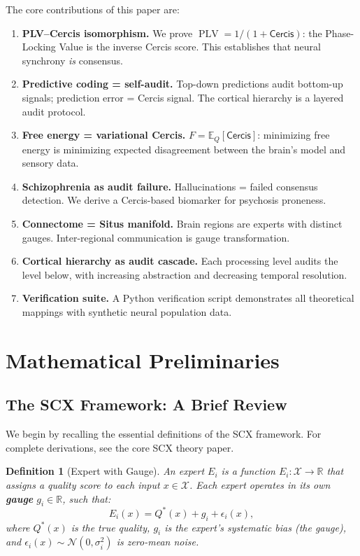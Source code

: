 \documentclass[12pt,a4paper]{article}
\newtheorem{definition}[theorem]{Definition}
\theoremstyle{remark}
\newcommand{\R}{\mathbb{R}}
\newcommand{\E}{\mathbb{E}}
\newcommand{\X}{\mathcal{X}}
\newcommand{\SCX}{\textsf{SCX}}
\newcommand{\Cercis}{\textsf{Cercis}}
\newcommand{\Situs}{\textsf{Situs}}
\newcommand{\FreeEnergy}{F}
\DeclareMathOperator{\PLV}{PLV}
\begin{document}
The core contributions of this paper are:

\begin{enumerate}[label=\textbf{C\arabic*}, leftmargin=*]
    \item \textbf{PLV--Cercis isomorphism.} We prove $\PLV = 1/(1 + \Cercis)$: the Phase-Locking Value is the inverse \Cercis{} score. This establishes that neural synchrony \emph{is} consensus.
    \item \textbf{Predictive coding = self-audit.} Top-down predictions audit bottom-up signals; prediction error = \Cercis{} signal. The cortical hierarchy is a layered audit protocol.
    \item \textbf{Free energy = variational \Cercis.} $\FreeEnergy = \E_Q[\Cercis]$: minimizing free energy is minimizing expected disagreement between the brain's model and sensory data.
    \item \textbf{Schizophrenia as audit failure.} Hallucinations = failed consensus detection. We derive a \Cercis{}-based biomarker for psychosis proneness.
    \item \textbf{Connectome = \Situs{} manifold.} Brain regions are experts with distinct gauges. Inter-regional communication is gauge transformation.
    \item \textbf{Cortical hierarchy as audit cascade.} Each processing level audits the level below, with increasing abstraction and decreasing temporal resolution.
    \item \textbf{Verification suite.} A Python verification script demonstrates all theoretical mappings with synthetic neural population data.
\end{enumerate}

\section{Mathematical Preliminaries}
\label{sec:prelim}

\subsection{The SCX Framework: A Brief Review}

We begin by recalling the essential definitions of the \SCX{} framework.
For complete derivations, see the core SCX theory paper.

\begin{definition}[Expert with Gauge]\label{def:expert-gauge}
An expert $E_i$ is a function $E_i: \X \to \R$ that assigns a quality score
to each input $x \in \X$. Each expert operates in its own \textbf{gauge}
$g_i \in \R$, such that:
\begin{equation}\label{eq:expert-gauge-def}
    E_i(x) = Q^*(x) + g_i + \epsilon_i(x),
\end{equation}
where $Q^*(x)$ is the true quality, $g_i$ is the expert's systematic bias
(the gauge), and $\epsilon_i(x) \sim \mathcal{N}(0, \sigma_i^2)$ is
zero-mean noise.
\end{definition}
\end{document}
